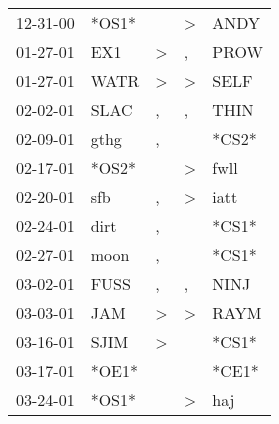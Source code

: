 \begin{supertabular}{p{0.07\textwidth}p{0.06\textwidth}p{0.02\textwidth}p{0.02\textwidth}p{0.06\textwidth}}
          12-31-00\textsuperscript{} &                            *OS1* &                  &     \textgreater &           ANDY\textsuperscript{} \\
          01-27-01\textsuperscript{} &            EX1\textsuperscript{} &     \textgreater &                , &           PROW\textsuperscript{} \\
          01-27-01\textsuperscript{} &           WATR\textsuperscript{} &     \textgreater &     \textgreater &           SELF\textsuperscript{} \\
          02-02-01\textsuperscript{} &           SLAC\textsuperscript{} &                , &                , &           THIN\textsuperscript{} \\
          02-09-01\textsuperscript{} &           gthg\textsuperscript{} &                , &                  &                            *CS2* \\
          02-17-01\textsuperscript{} &                            *OS2* &                  &     \textgreater &           fwll\textsuperscript{} \\
          02-20-01\textsuperscript{} &            sfb\textsuperscript{} &                , &     \textgreater &           iatt\textsuperscript{} \\
          02-24-01\textsuperscript{} &           dirt\textsuperscript{} &                , &                  &                            *CS1* \\
          02-27-01\textsuperscript{} &           moon\textsuperscript{} &                , &                  &                            *CS1* \\
          03-02-01\textsuperscript{} &           FUSS\textsuperscript{} &                , &                , &           NINJ\textsuperscript{} \\
          03-03-01\textsuperscript{} &            JAM\textsuperscript{} &     \textgreater &     \textgreater &           RAYM\textsuperscript{} \\
          03-16-01\textsuperscript{} &           SJIM\textsuperscript{} &     \textgreater &                  &                            *CS1* \\
          03-17-01\textsuperscript{} &                            *OE1* &                  &                  &                            *CE1* \\
          03-24-01\textsuperscript{} &                            *OS1* &                  &     \textgreater &            haj\textsuperscript{} \\

\end{supertabular}
